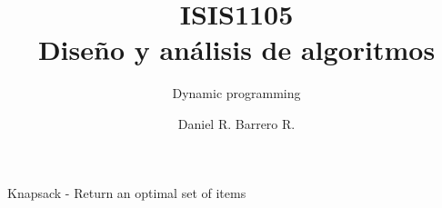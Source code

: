 \documentclass{beamer}
\title{ISIS1105\\ Diseño y análisis de algoritmos}
\subtitle{Dynamic programming}
\author{Daniel R. Barrero R.}
\begin{document}
\frame{\titlepage}

%

\begin{frame}{Knapsack - Return an optimal set of items}
\end{frame}
\end{document}
